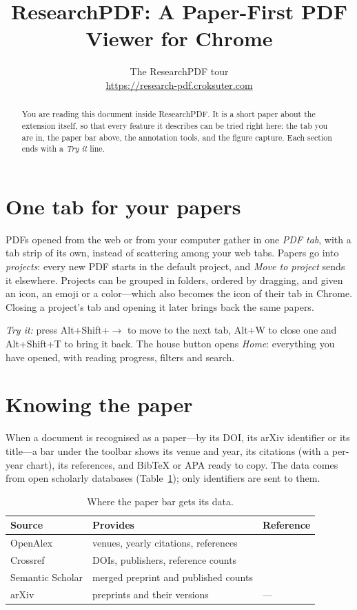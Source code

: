 \documentclass[11pt]{article}
\title{\textbf{ResearchPDF: A Paper-First PDF Viewer for Chrome}}
\author{The ResearchPDF tour\\[2pt]\small\url{https://research-pdf.croksuter.com}}
\date{}
\begin{document}
\maketitle

\begin{abstract}
\noindent
You are reading this document inside ResearchPDF. It is a short paper about
the extension itself, so that every feature it describes can be tried right
here: the tab you are in, the paper bar above, the annotation tools, and the
figure capture. Each section ends with a \emph{Try it} line.
\end{abstract}

\section{One tab for your papers}
PDFs opened from the web or from your computer gather in one \emph{PDF tab},
with a tab strip of its own, instead of scattering among your web tabs.
Papers go into \emph{projects}: every new PDF starts in the default project,
and \emph{Move to project} sends it elsewhere. Projects can be grouped in
folders, ordered by dragging, and given an icon, an emoji or a color---which
also becomes the icon of their tab in Chrome. Closing a project's tab and
opening it later brings back the same papers.

\smallskip\noindent\emph{Try it:} press \textsf{Alt+Shift+\(\rightarrow\)} to
move to the next tab, \textsf{Alt+W} to close one and
\textsf{Alt+Shift+T} to bring it back. The house button opens \emph{Home}:
everything you have opened, with reading progress, filters and search.

\section{Knowing the paper}
When a document is recognised as a paper---by its DOI, its arXiv identifier
or its title---a bar under the toolbar shows its venue and year, its
citations (with a per-year chart), its references, and BibTeX or APA ready to
copy. The data comes from open scholarly databases
(Table~\ref{tab:sources}); only identifiers are sent to them.

\begin{table}[h]
\centering
\caption{Where the paper bar gets its data.}
\label{tab:sources}
\begin{tabular}{@{}lll@{}}
\toprule
Source & Provides & Reference \\
\midrule
OpenAlex & venues, yearly citations, references & \cite{openalex} \\
Crossref & DOIs, publishers, reference counts & \cite{crossref} \\
Semantic Scholar & merged preprint and published counts & \cite{s2} \\
arXiv & preprints and their versions & --- \\
\bottomrule
\end{tabular}
\end{table}
\end{document}
